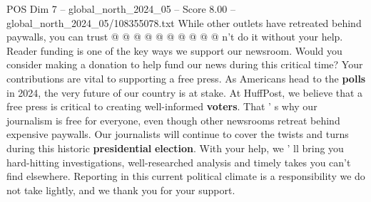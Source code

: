 \begin{textsample}{POS Dim 7 – global\_north\_2024\_05 – Score 8.00 – global\_north\_2024\_05/108355078.txt}
While other outlets have retreated behind paywalls, you can trust @ @ @ @ @ @ @ @ @ @ n't do it without your help.
Reader funding is one of the key ways we support our newsroom.
Would you consider making a donation to help fund our news during this critical time?
Your contributions are vital to supporting a free press.
As Americans head to the \textbf{polls} in 2024, the very future of our country is at stake.
At HuffPost, we believe that a free press is critical to creating well-informed \textbf{voters}.
That ' s why our journalism is free for everyone, even though other newsrooms retreat behind expensive paywalls.
Our journalists will continue to cover the twists and turns during this historic \textbf{presidential} \textbf{election}.
With your help, we ' ll bring you hard-hitting investigations, well-researched analysis and timely takes you can't find elsewhere.
Reporting in this current political climate is a responsibility we do not take lightly, and we thank you for your support.

\end{textsample}

